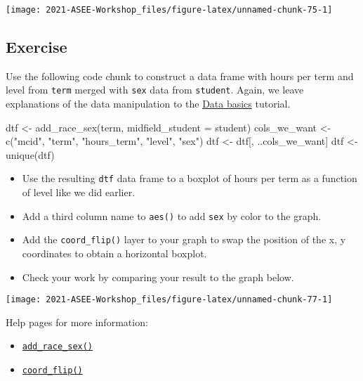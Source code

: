 \documentclass[
]{book}
\newenvironment{Shaded}{\begin{snugshade}}{\end{snugshade}}
\newcommand{\AttributeTok}[1]{\textcolor[rgb]{0.77,0.63,0.00}{#1}}
\newcommand{\FunctionTok}[1]{\textcolor[rgb]{0.00,0.00,0.00}{#1}}
\newcommand{\NormalTok}[1]{#1}
\newcommand{\OtherTok}[1]{\textcolor[rgb]{0.56,0.35,0.01}{#1}}
\newcommand{\StringTok}[1]{\textcolor[rgb]{0.31,0.60,0.02}{#1}}
\providecommand{\tightlist}{%
  \setlength{\itemsep}{0pt}\setlength{\parskip}{0pt}}
\begin{document}
\texttt{[image: 2021-ASEE-Workshop\_files/figure-latex/unnamed-chunk-75-1]}

\hypertarget{exercise-4}{%
\subsection{Exercise}\label{exercise-4}}

Use the following code chunk to construct a data frame with hours per term and level from \texttt{term} merged with \texttt{sex} data from \texttt{student}. Again, we leave explanations of the data manipulation to the \protect\hyperlink{data-basics}{Data basics} tutorial.

\begin{Shaded}
\begin{Highlighting}[]
\NormalTok{dtf }\OtherTok{\textless{}{-}} \FunctionTok{add\_race\_sex}\NormalTok{(term, }
                    \AttributeTok{midfield\_student =}\NormalTok{ student)}
\NormalTok{cols\_we\_want }\OtherTok{\textless{}{-}} \FunctionTok{c}\NormalTok{(}\StringTok{"mcid"}\NormalTok{, }\StringTok{"term"}\NormalTok{, }\StringTok{"hours\_term"}\NormalTok{, }\StringTok{"level"}\NormalTok{, }\StringTok{"sex"}\NormalTok{)}
\NormalTok{dtf }\OtherTok{\textless{}{-}}\NormalTok{ dtf[, ..cols\_we\_want]}
\NormalTok{dtf }\OtherTok{\textless{}{-}} \FunctionTok{unique}\NormalTok{(dtf)}
\end{Highlighting}
\end{Shaded}

\begin{itemize}
\tightlist
\item
  Use the resulting \texttt{dtf} data frame to a boxplot of hours per term as a function of level like we did earlier.
\item
  Add a third column name to \texttt{aes()} to add \texttt{sex} by color to the graph.
\item
  Add the \texttt{coord\_flip()} layer to your graph to swap the position of the x, y coordinates to obtain a horizontal boxplot.
\item
  Check your work by comparing your result to the graph below.
\end{itemize}

\texttt{[image: 2021-ASEE-Workshop\_files/figure-latex/unnamed-chunk-77-1]}

Help pages for more information:

\begin{itemize}
\tightlist
\item
  \href{https://midfieldr.github.io/midfieldr/reference/add_race_sex.html}{\texttt{add\_race\_sex()}}
\item
  \href{https://ggplot2.tidyverse.org/reference/coord_flip.html}{\texttt{coord\_flip()}}
\end{itemize}
\end{document}
